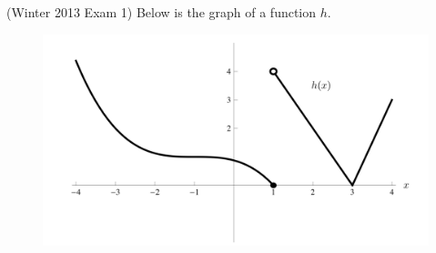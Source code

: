\documentclass[11pt]{exam}
\begin{document}
\begin{questions}
\begin{solution}
        \end{solution}
  \question (Winter 2013 Exam 1) Below is the graph of a function $h$.
\begin{figure}[h]
\includegraphics[scale=0.5]{graphh}
\end{figure}


\end{questions}
\end{document}
